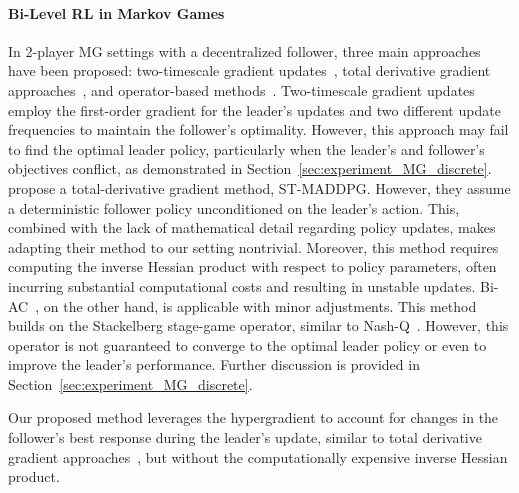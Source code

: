 \documentclass[letterpaper]{article} %
\begin{document}
\paragraph{Bi-Level RL in Markov Games}
In 2-player MG settings with a decentralized follower, three main approaches have been proposed: two-timescale gradient updates~\citep{Rajeswaran2020-gv,Vu2022-jq}, total derivative gradient approaches~\citep{Yang2023-tf}, and operator-based methods~\citep{Zhang2020-hw}.
Two-timescale gradient updates~\citep{Rajeswaran2020-gv,Vu2022-jq} employ the first-order gradient for the leader's updates and two different update frequencies to maintain the follower's optimality.
However, this approach may fail to find the optimal leader policy, particularly when the leader's and follower's objectives conflict, as demonstrated in Section~\ref{sec:experiment_MG_discrete}.
%
\citet{Yang2023-tf} propose a total-derivative gradient method, ST-MADDPG.
However, they assume a deterministic follower policy unconditioned on the leader’s action. This, combined with the lack of mathematical detail regarding policy updates, makes adapting their method to our setting nontrivial.
Moreover, this method requires computing the inverse Hessian product with respect to policy parameters, often incurring substantial computational costs and resulting in unstable updates.
%
Bi-AC~\citep{Zhang2020-hw}, on the other hand, is applicable with minor adjustments. 
This method builds on the Stackelberg stage-game operator, similar to Nash-Q~\citep{Hu2003-vz}.
However, this operator is not guaranteed to converge to the optimal leader policy or even to improve the leader's performance.
Further discussion is provided in Section~\ref{sec:experiment_MG_discrete}.

Our proposed method leverages the hypergradient to account for changes in the follower's best response during the leader's update, similar to total derivative gradient approaches~\citep{Yang2023-tf}, but without the computationally expensive inverse Hessian product.


\end{document}
